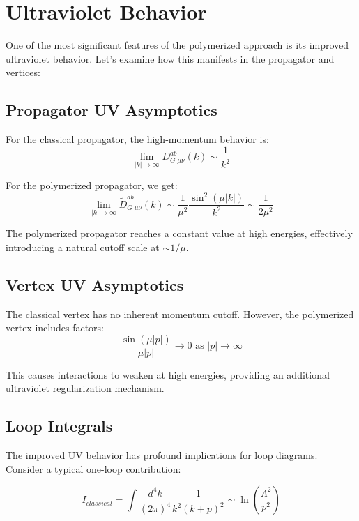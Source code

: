 \documentclass[11pt]{article}
\begin{document}
\section{Ultraviolet Behavior}

One of the most significant features of the polymerized approach is its improved ultraviolet behavior. Let's examine how this manifests in the propagator and vertices:

\subsection{Propagator UV Asymptotics}

For the classical propagator, the high-momentum behavior is:
\begin{equation}
    \lim_{|k| \to \infty} D_G^{ab}{}_{\mu\nu}(k) \sim \frac{1}{k^2}
\end{equation}

For the polymerized propagator, we get:
\begin{equation}
    \lim_{|k| \to \infty} \widetilde{D}_G^{ab}{}_{\mu\nu}(k) \sim \frac{1}{\mu^2}\frac{\sin^2(\mu|k|)}{k^2} \sim \frac{1}{2\mu^2}
\end{equation}

The polymerized propagator reaches a constant value at high energies, effectively introducing a natural cutoff scale at $\sim 1/\mu$.

\subsection{Vertex UV Asymptotics}

The classical vertex has no inherent momentum cutoff. However, the polymerized vertex includes factors:
\begin{equation}
    \frac{\sin(\mu|p|)}{\mu|p|} \to 0 \text{ as } |p| \to \infty
\end{equation}

This causes interactions to weaken at high energies, providing an additional ultraviolet regularization mechanism.

\subsection{Loop Integrals}

The improved UV behavior has profound implications for loop diagrams. Consider a typical one-loop contribution:

\begin{equation}
    I_{classical} = \int \frac{d^4k}{(2\pi)^4} \frac{1}{k^2(k+p)^2} \sim \ln\left(\frac{\Lambda^2}{p^2}\right)
\end{equation}
\end{document}
